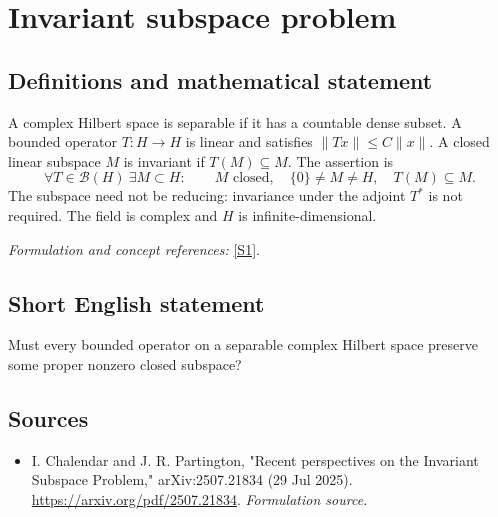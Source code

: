 \documentclass[11pt]{article}
\begin{document}
\section*{\texorpdfstring{Invariant subspace problem}{Invariant subspace problem}}\label{statement}
\subsection{Definitions and mathematical statement}
A complex Hilbert space is separable if it has a countable dense subset. A bounded operator $T:H\to H$ is linear and satisfies $\|Tx\|\le C\|x\|$. A closed linear subspace $M$ is invariant if $T(M)\subseteq M$. The assertion is
\[
 \forall T\in\mathcal B(H)\ \exists M\subset H:\qquad
 M\text{ closed},\quad\{0\}\ne M\ne H,\quad T(M)\subseteq M.
\]
The subspace need not be reducing: invariance under the adjoint $T^*$ is not required. The field is complex and $H$ is infinite-dimensional.
\par\smallskip\textit{Formulation and concept references:} \href{https://arxiv.org/pdf/2507.21834}{[S1]}.

\subsection{Short English statement}
Must every bounded operator on a separable complex Hilbert space preserve some proper nonzero closed subspace?
\subsection{Sources}
\begin{itemize}
\item[S1]I. Chalendar and J. R. Partington, "Recent perspectives on the Invariant Subspace Problem," arXiv:2507.21834 (29 Jul 2025).
\url{https://arxiv.org/pdf/2507.21834}.
\textit{Formulation source.}
\end{itemize}
\end{document}
